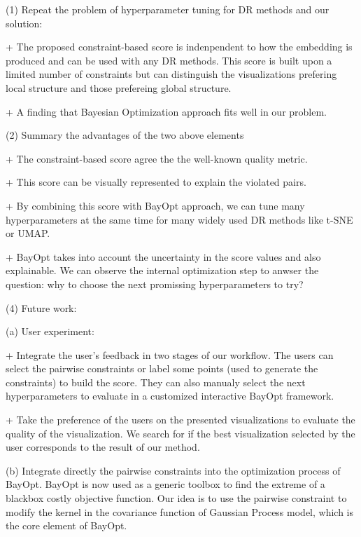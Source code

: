 \par (1) Repeat the problem of hyperparameter tuning for DR methods and our solution:

+ The proposed constraint-based score is indenpendent to how the embedding is produced and can be used with any DR methods.
This score is built upon a limited number of constraints but can distinguish the visualizations prefering local structure and those prefereing global structure.

+ A finding that Bayesian Optimization approach fits well in our problem.


\vspace{8pt}
\par (2) Summary the advantages of the two above elements

+ The constraint-based score agree the the well-known quality metric.

+ This score can be visually represented to explain the violated pairs.

+ By combining this score with BayOpt approach, we can tune many hyperparameters at the same time for many widely used DR methods like t-SNE or UMAP.

+ BayOpt takes into account the uncertainty in the score values and also explainable. We can observe the internal optimization step to anwser the question: why to choose the next promissing hyperparameters to try?


\vspace{8pt}
\par (4) Future work:

(a) User experiment:

+ Integrate the user's feedback in two stages of our workflow.
The users can select the pairwise constraints or label some points (used to generate the constraints) to build the score.
They can also manualy select the next hyperparameters to evaluate in a customized interactive BayOpt framework.

+ Take the preference of the users on the presented visualizations to evaluate the quality of the visualization. We search for if the best visualization selected by the user corresponds to the result of our method.


(b) Integrate directly the pairwise constraints into the optimization process of BayOpt.
BayOpt is now used as a generic toolbox to find the extreme of a blackbox costly objective function.
Our idea is to use the pairwise constraint to modify the kernel in the covariance function of Gaussian Process model, which is the core element of BayOpt.
